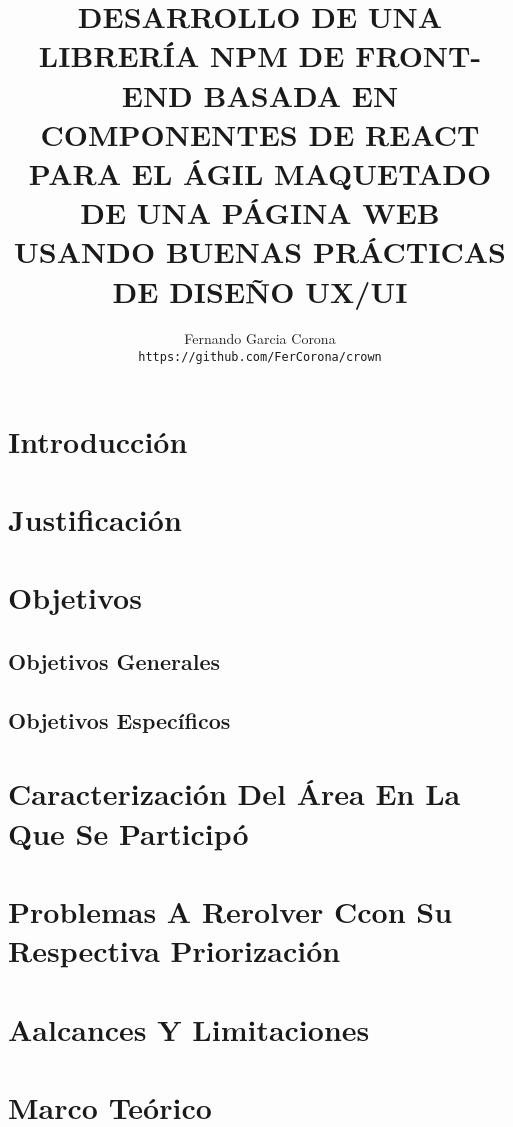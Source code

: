 \documentclass[a4paper,12pt]{report}
\author{
  Fernando Garcia Corona\\
  \texttt{https://github.com/FerCorona/crown}
}
\title{DESARROLLO DE UNA LIBRERÍA NPM DE FRONT-END BASADA EN COMPONENTES DE REACT PARA EL ÁGIL MAQUETADO DE UNA PÁGINA WEB USANDO BUENAS PRÁCTICAS DE DISEÑO UX/UI}
\begin{document}
	\maketitle
	
	\tableofcontents
		
		\listoffigures
		
		\chapter {Introducción}
			
		\chapter {Justificación }
			
		
		\chapter {Objetivos }
			\section {Objetivos Generales}
				
			
			\section {Objetivos Específicos} 
				
		
		\chapter {Caracterización Del Área En La Que Se Participó  }
			
		
		\chapter {Problemas A Rerolver Ccon Su Respectiva Priorización }
			
			
		\chapter {Aalcances Y Limitaciones }
				
		
		\chapter {Marco Teórico  }
			
		
\end{document}
